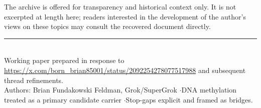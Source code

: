 \documentclass[11pt,a4paper]{article}
\begin{document}
The archive is offered for transparency and historical context only. It is not excerpted at length here; readers interested in the development of the author's views on these topics may consult the recovered document directly.


\vspace{1.2em}
\noindent\rule{\textwidth}{0.6pt}\\[0.4em]
{\footnotesize
Working paper prepared in response to \url{https://x.com/born_brian85001/status/2092254278077517988} and subsequent thread refinements.\\
Authors: Brian Fundakowski Feldman, Grok/SuperGrok \quad$\cdot$\quad DNA methylation treated as a primary candidate carrier \quad$\cdot$\quad Stop-gaps explicit and framed as bridges.
}
\end{document}
